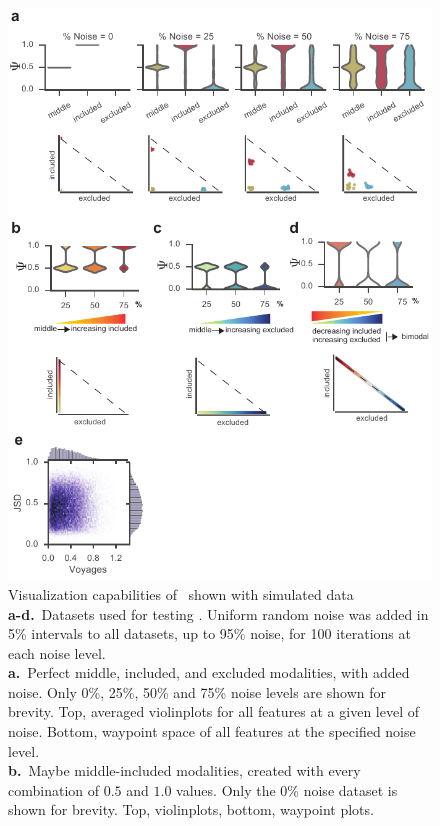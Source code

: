 \begin{figure}
  \centering
  \includegraphics[width=5.8in]{figures/bonvoyage_simulations}
  \caption[Visualization capabilities of \bonvoyage\, shown with simulated data.]{Visualization capabilities of \bonvoyage\, shown with simulated data\\
\textbf{a-d.}~Datasets used for testing \bonvoyage. Uniform random noise was added in 5\% intervals to all datasets, up to 95\% noise, for 100 iterations at each noise level.\\
\textbf{a.}~Perfect middle, included, and excluded modalities, with added noise. Only 0\%, 25\%, 50\% and 75\% noise levels are shown for brevity. Top, averaged violinplots for all features at a given level of noise. Bottom, waypoint space of all features at the specified noise level.\\
\textbf{b.}~Maybe middle-included modalities, created with every combination of $0.5$ and $1.0$ values. Only the 0\% noise dataset is shown for brevity. Top, violinplots, bottom, waypoint plots.\\
}
\end{figure}
